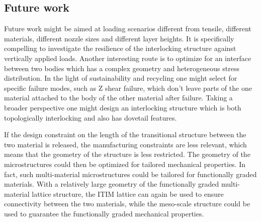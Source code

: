\subsection{Future work}
Future work might be aimed at loading scenarios different from tensile, different materials, different nozzle sizes and different layer heights.
It is specifically compelling to investigate the resilience of the interlocking structure against vertically applied loads.
Another interesting route is to optimize for an interface between two bodies which has a complex geometry and heterogeneous stress distribution.
In the light of sustainability and recycling one might select for specific failure modes, such as Z shear failure, which don't leave parts of the one material attached to the body of the other material after failure.
Taking a broader perspective one might design an interlocking structure which is both topologically interlocking and also has dovetail features.

If the design constraint on the length of the transitional structure between the two material is released,
the manufacturing constraints are less relevant, which means that the geometry of the structure is less restricted.
The geometry of the microstructures could then be optimized for tailored mechanical properties.
In fact, such multi-material microstructures could be tailored for functionally graded materials.
With a relatively large geometry of the functionally graded multi-material lattice structure,
the ITIM lattice can again be used to ensure connectivity between the two materials,
while the meso-scale structure could be used to guarantee the functionally graded mechanical properties.
